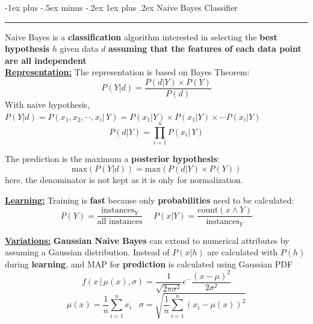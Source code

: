 \documentclass[letterpaper, 10.5pt,landscape]{article}
\makeatletter
\renewcommand{\subsubsection}{\@startsection{subsubsection}{3}{0mm}%
                                {-1ex plus -.5ex minus -.2ex}%
                                {1ex plus .2ex}%
                                {\normalfont\small\bfseries}}
\makeatother
\begin{document}
\begin{multicols*}{3}
\subsubsection{Naive Bayes Classifier} {\color{teal}\hrule height 0.5pt} \smallskip

Naive Bayes is a \textbf{classification} algorithm interested in
selecting the \textbf{best hypothesis} $h$ given data $d$ \textbf{assuming that the features of each data point are all independent}  \\

\textbf{\underline{Representation:}} 
The representation is based on Bayes Theorem:
\vspace{-3pt}
\[\boxed{P(Y|d) = \frac{P(d|Y) \times P(Y)}{P(d)}} \]
With naive hypothesis, \(P(Y|d) = P(x_{1}, x_{2}, \cdots, x_{i} | \, Y) = P(x_{1} | Y) \times P(x_{1} | Y) \times \cdots P(x_{i} | Y) \) 
\vspace{-3pt}
\[\boxed{P(d|Y) = \prod^{n}_{i=1} P(x_{i} | \, Y)} \]

\vspace{3pt}
The prediction is the maximum a \textbf{posterior hypothesis}:
\vspace{-3pt}
\[\boxed{\text{max}\left(P(Y|d)\right) = \text{max}\left(P(d|Y) \times P(Y)\right)} \] 
here, the denominator is not kept as it is only for normalization.

\vspace{3pt}
\textbf{\underline{Learning:}} Training is \textbf{fast} because only \textbf{probabilities} need to be calculated: 
\vspace{-3pt}
\[\boxed{P(Y) = \frac{\text{instances}_{Y}}{ \text{all instances}}} \hspace{15pt} \boxed{P(x|Y) = \frac{\text{count}(x \land Y  )}{\text{instances}_{Y}}}\]



\vspace{3pt} 
\textbf{\underline{Variations:}} \textbf{Gaussian Naive Bayes} can extend to numerical attributes by assuming a Gaussian distribution. Instead of $P(x|h)$ are calculated with $P(h)$ during \textbf{learning}, and MAP for \textbf{prediction} is calculated using Gaussian PDF
\vspace{-3pt}
\[\boxed{f(x \, | \,  \mu(x), \sigma) = \frac{1}{\sqrt{2 \pi \sigma^{2}}} e^-{\frac{(x-\mu)^{2}}{2\sigma^{2}}} }\]
\vspace{-3pt}
\[\mu(x) = \frac{1}{n} \sum^{n}_{i=1} x_{i} \hspace{10pt}  \sigma = \sqrt{\frac{1}{n} \sum^{n}_{i=1} \left( x_{i} - \mu(x) \right)^{2}} \]





\end{multicols*}
\end{document}

